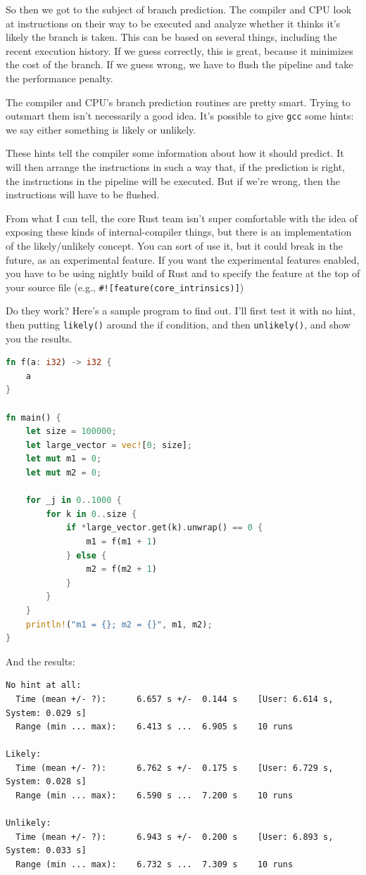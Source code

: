 \documentclass[a4paper]{report}
\begin{document}
So then we got to the subject of branch prediction. The compiler and CPU look at instructions on their way to be executed and analyze whether it thinks it's likely the branch is taken. This can be based on several things, including the recent execution history. If we guess correctly, this is great, because it minimizes the cost of the branch. If we guess wrong, we have to flush the pipeline and take the performance penalty.

The compiler and CPU's branch prediction routines are pretty smart. Trying to outsmart them isn't necessarily a good idea. It's possible to give \texttt{gcc} some hints: we say either something is likely or unlikely. 

 These hints tell the compiler some information about how it should predict. It will then arrange the instructions in such a way that, if the prediction is right, the instructions in the pipeline will be executed. But if we're wrong, then the instructions will have to be flushed.

From what I can tell, the core Rust team isn't super comfortable with the idea of exposing these kinds of internal-compiler things, but there is an implementation of the likely/unlikely concept. You can sort of use it, but it could break in the future, as an experimental feature. If you want the experimental features enabled, you have to be using nightly build of Rust and to specify the feature at the top of your source file (e.g., \texttt{\#![feature(core\_intrinsics)]})

Do they work? Here's a sample program to find out. I'll first test it with no hint, then putting \texttt{likely()} around the if condition, and then \texttt{unlikely()}, and show you the results.

\begin{lstlisting}[language=Rust]
fn f(a: i32) -> i32 {
    a
}

fn main() {
    let size = 100000;
    let large_vector = vec![0; size];
    let mut m1 = 0;
    let mut m2 = 0;

    for _j in 0..1000 {
        for k in 0..size {
            if *large_vector.get(k).unwrap() == 0 {
                m1 = f(m1 + 1)
            } else {
                m2 = f(m2 + 1)
            }
        }
    }
    println!("m1 = {}; m2 = {}", m1, m2);
}
\end{lstlisting}

And the results:
\begin{verbatim}
No hint at all:
  Time (mean +/- ?):      6.657 s +/-  0.144 s    [User: 6.614 s, System: 0.029 s]
  Range (min ... max):    6.413 s ...  6.905 s    10 runs
  
Likely:
  Time (mean +/- ?):      6.762 s +/-  0.175 s    [User: 6.729 s, System: 0.028 s]
  Range (min ... max):    6.590 s ...  7.200 s    10 runs

Unlikely:
  Time (mean +/- ?):      6.943 s +/-  0.200 s    [User: 6.893 s, System: 0.033 s]
  Range (min ... max):    6.732 s ...  7.309 s    10 runs
\end{verbatim}
\end{document}
